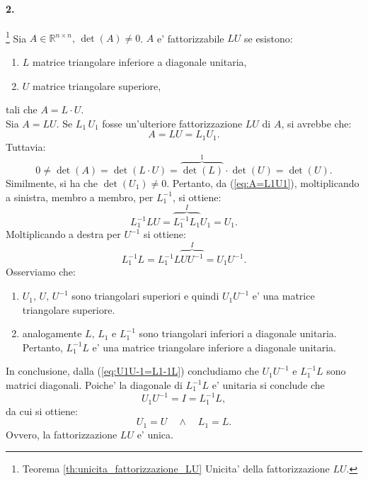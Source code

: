 \paragraph{2.}\footnote{Teorema \ref{th:unicita_fattorizzazione_LU} Unicita' della fattorizzazione $LU$.} Sia $A\in\mathbb{R}^{n \times n},\, \det(A)\neq 0$. $A$ e' fattorizzabile $LU$ se esistono:
\begin{enumerate}
	\item $L$ matrice triangolare inferiore a diagonale unitaria,
	\item $U$ matrice triangolare superiore,
\end{enumerate}
tali che $A=L\cdot U$.\\
Sia $A=LU$. Se $L_1\, U_1$ fosse un'ulteriore fattorizzazione $LU$ di $A$, si avrebbe che:
\begin{equation}\label{eq:A=L1U1}
	A=LU=L_1U_1.
\end{equation}
Tuttavia:
\begin{equation*}
	0 \neq \det(A) = \det(L\cdot U) = \overbrace{\det(L)}^{1}\cdot\det(U) = \det(U).
\end{equation*}
Similmente, si ha che $\det(U_1)\neq 0$. Pertanto, da (\ref{eq:A=L1U1}), moltiplicando a sinistra, membro a membro, per $L_1^{-1}$, si ottiene:
\begin{equation*}
	L_1^{-1}LU=\overbrace{L_1^{-1}L_1}^{I}U_1 = U_1. 
\end{equation*}
Moltiplicando a destra per $U^{-1}$ si ottiene:
\begin{equation}\label{eq:U1U-1=L1-1L}
	L_1^{-1}L=L_1^{-1} L \overbrace{UU^{-1}}^{I}=U_1U^{-1}.
\end{equation}
Osserviamo che:
\begin{enumerate}
	\item $U_1,\, U,\, U^{-1}$ sono triangolari superiori e quindi $U_1U^{-1}$ e' una matrice triangolare superiore.
	\item analogamente $L,\, L_1$ e $L_1^{-1}$ sono triangolari inferiori a diagonale unitaria. Pertanto, $L_1^{-1}L$ e' una matrice triangolare inferiore a diagonale unitaria.
\end{enumerate}
In conclusione, dalla (\ref{eq:U1U-1=L1-1L}) concludiamo che $U_1U^{-1}$ e $L_1^{-1}L$ sono matrici diagonali. Poiche' la diagonale di $L_1^{-1}L$ e' unitaria si conclude che
\begin{equation*}
	U_1U^{-1} = I = L_1^{-1}L,
\end{equation*}
da cui si ottiene:
\begin{equation*}
	U_1 = U \quad \wedge \quad L_1 = L.
\end{equation*}
Ovvero, la fattorizzazione $LU$ e' unica.

